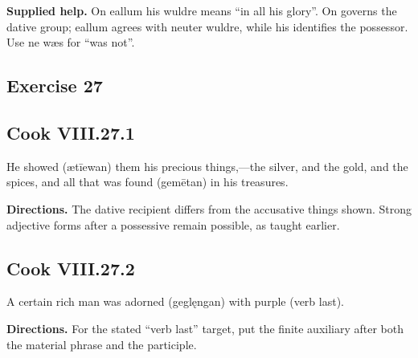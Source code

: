 \textbf{Supplied help.} On eallum his wuldre means “in all his glory”. On governs the dative group; eallum agrees with neuter wuldre, while his identifies the possessor. Use ne wæs for “was not”.

\subsection*{Exercise 27}

\par\begin{minipage}{\linewidth}\raggedright
\subsection*{Cook VIII.27.1}

He showed (ætīewan) them his precious things,—the silver, and the gold, and the spices, and all that was found (gemētan) in his treasures.

\textbf{Directions.} The dative recipient differs from the accusative things shown. Strong adjective forms after a possessive remain possible, as taught earlier.

\end{minipage}\par\addvspace{4pt}

\par\begin{minipage}{\linewidth}\raggedright
\subsection*{Cook VIII.27.2}

A certain rich man was adorned (geglęngan) with purple (verb last).

\textbf{Directions.} For the stated “verb last” target, put the finite auxiliary after both the material phrase and the participle.

\end{minipage}\par\addvspace{4pt}

